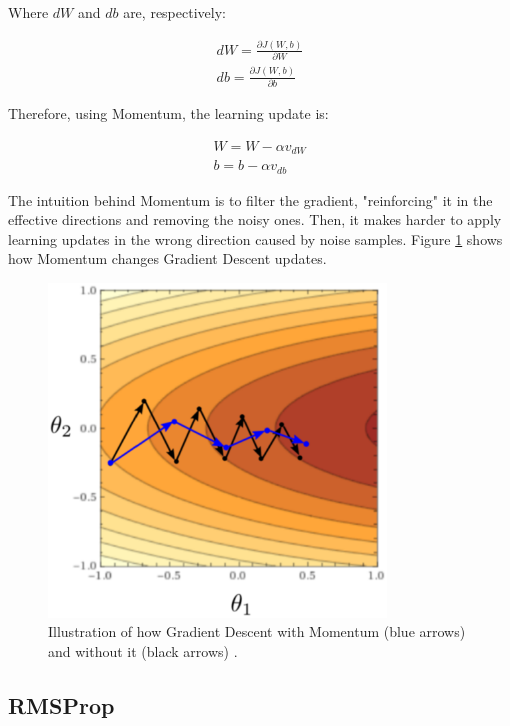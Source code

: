 Where $dW$ and $db$ are, respectively:

\begin{align}
dW = \frac{\partial{J(W,b)}}{\partial{W}}\\
db = \frac{\partial{J(W,b)}}{\partial{b}}
\end{align}

Therefore, using Momentum, the learning update is:

\begin{align}\label{eq:momentumupdate}
W = W - \alpha v_{dW}\\
b = b - \alpha v_{db}
\end{align}

The intuition behind Momentum is to filter the gradient, "reinforcing" it in the effective directions and removing the noisy ones. Then, it makes harder to apply learning updates in the wrong direction caused by noise samples. Figure \ref{fig:momentum} shows how Momentum changes Gradient Descent updates.


\begin{figure}[!htbp]
	\centering
	\includegraphics[width=0.8\textwidth]{Cap3/momentum.eps}
	\caption{ Illustration of how Gradient Descent with Momentum (blue arrows) and without it (black arrows)
		\cite{tgilharco}.
	}
	\label{fig:momentum}
\end{figure}

\subsection{RMSProp}


